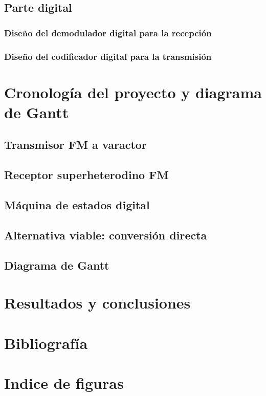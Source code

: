 \documentclass[11pt, a4paper]{article} %
\begin{document}
   \subsection{Parte digital}
   
   \subsubsection{Diseño del demodulador digital para la recepci\'on}
   
   \subsubsection{Diseño del codificador digital para la transmisi\'on}
   \label{sec:des_digital_tx}
   
%   

\newpage
\section{Cronolog\'ia del proyecto y diagrama de Gantt}
   
   \subsection{Transmisor FM a varactor}
   
   \subsection{Receptor superheterodino FM}
   
   \subsection{M\'aquina de estados digital}
   \label{sec:crono_digital}
   
   \subsection{Alternativa viable: conversi\'on directa}
   
   \subsection{Diagrama de Gantt}
   
\newpage

\section{Resultados y conclusiones}
   

\newpage
\section{Bibliografía}
   

\section{Indice de figuras}
\listoffigures
\end{document}
